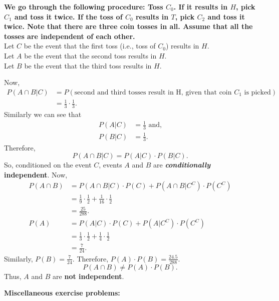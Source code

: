 \documentclass[12pt]{article}
\begin{document}
\begin{enumerate}
\textbf{We go through the following procedure: Toss $C_0$. If it results in $H$, pick $C_1$ and toss it twice. If the toss of $C_0$ results in $T$, pick $C_2$ and toss it twice. Note that there are three coin tosses in all. Assume that all the tosses are independent of each other.}\\

Let $C$ be the event that the first toss (i.e., toss of $C_0$) results in $H$.\\
Let $A$ be the event that the second toss results in $H$.\\
Let $B$ be the event that the third toss results in $H$.

Now,
\begin{align*}
P(A \cap B |C) &= P(\text{second and third tosses result in H, given that coin } C_1 \text{ is picked})\\
&= \frac{1}{3}\cdot\frac{1}{3}.
\end{align*}
Similarly we can see that
\begin{align*}
P(A|C) &= \frac{1}{3} \text{ and,}\\
P(B|C) &= \frac{1}{3}.
\end{align*}
Therefore,
\[
P(A \cap B | C) = P(A|C)\cdot P(B|C).
\]
So, conditioned on the event $C$, events $A$ and $B$ are \textbf{\emph{conditionally} independent}.
Now, 
\begin{align*}
P(A \cap B) &= P(A \cap B|C)\cdot P(C) + P(A \cap B|C^C)\cdot P(C^C)\\
&= \frac{1}{9} \cdot \frac{1}{2} + \frac{1}{16} \cdot \frac{1}{2}\\
&= \frac{25}{288}.\\
P(A) &= P(A|C)\cdot P(C) + P(A|C^C)\cdot P(C^C)\\
&= \frac{1}{3} \cdot \frac{1}{2} + \frac{1}{4} \cdot \frac{1}{2}\\
&= \frac{7}{24}.
\end{align*}
Similarly, $P(B) = \frac{7}{24}$. Therefore, $P(A)\cdot P(B) = \frac{24.5}{288}$.
\[
P(A \cap B ) \neq P(A)\cdot P(B).
\]
Thus, $A$ and $B$ are \textbf{not independent}.
\end{enumerate}

\par\textbf{ Miscellaneous exercise problems:} 
\end{document}
